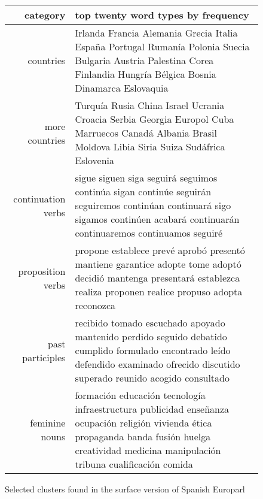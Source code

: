 \begin{figure*}[t!]
  \begin{tabular}{|r|p{10cm}|}
    \hline
    category  & top twenty word types by frequency \\
    \hline
    countries & Irlanda Francia Alemania Grecia Italia España Portugal Rumanía
    Polonia Suecia Bulgaria Austria Palestina Corea Finlandia Hungría Bélgica
    Bosnia Dinamarca Eslovaquia \\
    \hline
    more countries & Turquía Rusia China Israel Ucrania Croacia Serbia Georgia
    Europol Cuba Marruecos Canadá Albania Brasil Moldova Libia Siria Suiza
    Sudáfrica Eslovenia \\
    \hline
    continuation verbs & sigue siguen siga seguirá seguimos continúa
    sigan continúe seguirán seguiremos continúan continuará sigo sigamos
    continúen acabará continuarán continuaremos continuamos seguiré \\
    \hline
    proposition verbs & propone establece prevé aprobó presentó mantiene
    garantice adopte tome adoptó decidió mantenga presentará establezca realiza
    proponen realice propuso adopta reconozca \\
    \hline
    past participles & recibido tomado escuchado apoyado mantenido perdido
    seguido debatido cumplido formulado encontrado leído defendido examinado
    ofrecido discutido superado reunido acogido consultado \\
    \hline
    feminine nouns & formación educación tecnología infraestructura publicidad
    enseñanza ocupación religión vivienda ética propaganda banda fusión huelga
    creatividad medicina manipulación tribuna cualificación comida \\
    \hline
  \end{tabular}
\caption{Selected clusters found in the surface version of Spanish Europarl}
\label{fig:clusters-europarl-surface}
\end{figure*}

